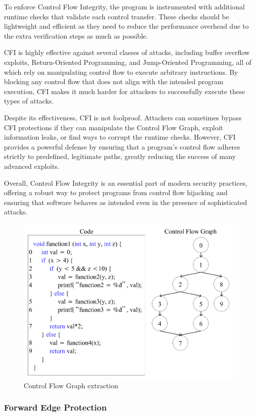 To enforce Control Flow Integrity, the program is instrumented with additional
runtime checks that validate each control transfer. These checks should be lightweight
and efficient as they need to reduce the performance overhead due to the extra verification
steps as much as possible.

CFI is highly effective against several classes of attacks, including buffer
overflow exploits, Return-Oriented Programming, and Jump-Oriented Programming, all
of which rely on manipulating control flow to execute arbitrary instructions. By
blocking any control flow that does not align with the intended program
execution, CFI makes it much harder for attackers to successfully execute these types
of attacks.

Despite its effectiveness, CFI is not foolproof. Attackers can sometimes bypass CFI
protections if they can manipulate the Control Flow Graph, exploit information
leaks, or find ways to corrupt the runtime checks. However, CFI provides a powerful
defense by ensuring that a program's control flow adheres strictly to predefined,
legitimate paths, greatly reducing the success of many advanced exploits.

Overall, Control Flow Integrity is an essential part of modern security
practices, offering a robust way to protect programs from control flow hijacking
and ensuring that software behaves as intended even in the presence of sophisticated
attacks.

\begin{figure}
  \centering
  \includegraphics[width=.6\linewidth]{images/cfg.png}
  \caption{Control Flow Graph extraction}
  \label{fig:cfg}
\end{figure}

\subsubsection{Forward Edge Protection}
\label{subsubsec:background_forward}

